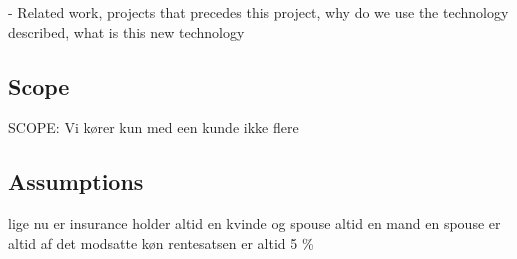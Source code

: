 - Related work, projects that precedes this project, why do we use the technology described, what is this new technology
\subsection{Scope}
	SCOPE: Vi kører kun med een kunde ikke flere
	
	\subsection{Assumptions}
	lige nu er insurance holder altid en kvinde og spouse altid en mand
	en spouse er altid af det modsatte køn
	rentesatsen er altid 5 \%
